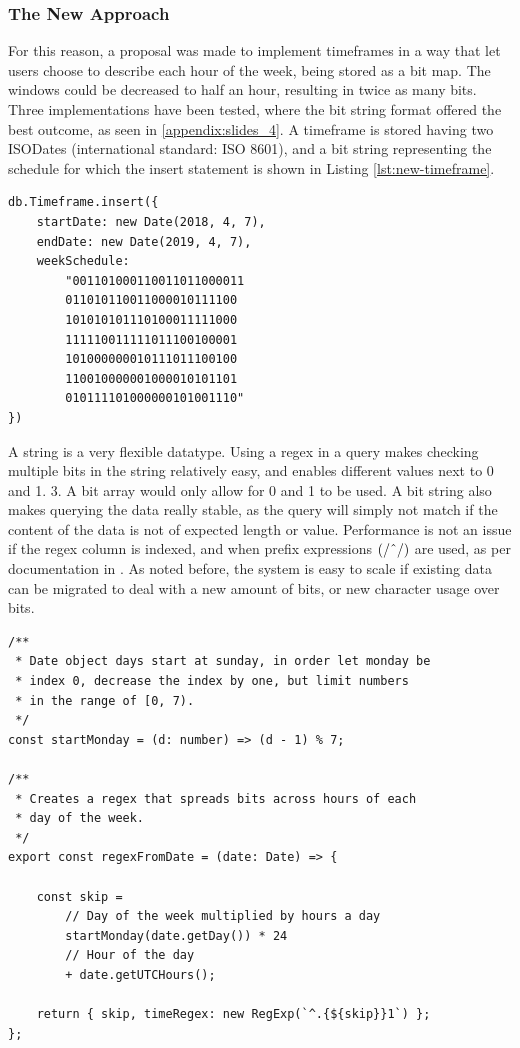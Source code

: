 \subsubsection{The New Approach}
For this reason, a proposal was made to implement timeframes in a way that let users choose to describe each hour of the week, being stored as a bit map. The windows could be decreased to half an hour, resulting in twice as many bits. Three implementations have been tested, where the bit string format offered the best outcome, as seen in \ref{appendix:slides_4}. A timeframe is stored having two ISODates (international standard: ISO 8601), and a bit string representing the schedule for which the insert statement is shown in Listing \ref{lst:new-timeframe}.

\begin{center}
\noindent\begin{minipage}{.85\textwidth}
\begin{lstlisting}[caption={Improved timeframe.}, label={lst:new-timeframe}]
db.Timeframe.insert({
	startDate: new Date(2018, 4, 7),
	endDate: new Date(2019, 4, 7),
	weekSchedule:
		"001101000110011011000011
		011010110011000010111100
		101010101110100011111000
		111110011111011100100001
		101000000010111011100100
		110010000001000010101101
		010111101000000101001110"
})
\end{lstlisting}
\end{minipage}
\end{center}

A string is a very flexible datatype. Using a regex in a query makes checking multiple bits in the string relatively easy, and enables different values next to 0 and 1. 3. A bit array would only allow for 0 and 1 to be used. A bit string also makes querying the data really stable, as the query will simply not match if the content of the data is not of expected length or value. Performance is not an issue if the regex column is indexed, and when prefix expressions $(/\string^/)$ are used, as per documentation in \cite{MongoDB-Regex}. As noted before, the system is easy to scale if existing data can be migrated to deal with a new amount of bits, or new character usage over bits.

\begin{center}
\noindent\begin{minipage}{.85\textwidth}
\begin{lstlisting}[caption={Opening timeframe.}, label={lst:open-timeframe}]
/**
 * Date object days start at sunday, in order let monday be
 * index 0, decrease the index by one, but limit numbers
 * in the range of [0, 7).
 */
const startMonday = (d: number) => (d - 1) % 7;

/**
 * Creates a regex that spreads bits across hours of each
 * day of the week.
 */
export const regexFromDate = (date: Date) => {

	const skip =
		// Day of the week multiplied by hours a day
		startMonday(date.getDay()) * 24
		// Hour of the day
		+ date.getUTCHours();

	return { skip, timeRegex: new RegExp(`^.{${skip}}1`) };
};
\end{lstlisting}
\end{minipage}
\end{center}


